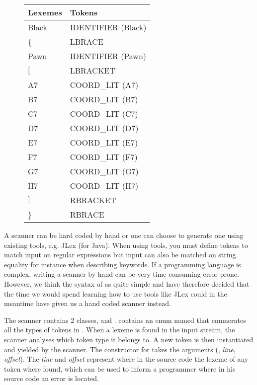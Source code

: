 \begin{figure}
\begin{tabular}{|l|l|}
        \hline
        Lexemes & Tokens             \\ \hline
        Black   & IDENTIFIER (Black) \\ 
        \{       & LBRACE             \\ 
        Pawn    & IDENTIFIER (Pawn)  \\ 
        $[$       & LBRACKET           \\ 
        A7      & COORD\_LIT (A7)     \\ 
        B7      & COORD\_LIT (B7)     \\ 
        C7      & COORD\_LIT (C7)     \\ 
        D7      & COORD\_LIT (D7)     \\ 
        E7      & COORD\_LIT (E7)     \\ 
        F7      & COORD\_LIT (F7)     \\ 
        G7      & COORD\_LIT (G7)     \\ 
        H7      & COORD\_LIT (H7)     \\ 
        $]$       & RBRACKET           \\ 
        \}       & RBRACE             \\
        \hline
\end{tabular}
\label{table:lexemestotokens}
\end{figure}

A scanner can be hard coded by hand or one can choose to generate one using existing tools, e.g. JLex (for Java). When using tools, you must define tokens to match input on regular expressions but input can also be matched on string equality for instance when describing keywords. If a programming language is complex, writing a scanner by hand can be very time consuming error prone. However, we think the syntax of \productname{} as quite simple and have therefore decided that the time we would spend learning how to use tools like JLex could in the meantime have given us a hand coded scanner instead.

The scanner contains 2 classes,  and .  contains an enum named  that enumerates all the types of tokens in \productname{}. When a lexeme is found in the input stream, the scanner analyses which token type it belongs to. A new token is then instantiated and yielded by the scanner. The constructor for  takes the arguments (, \textit{line}, \textit{offset}). The \textit{line} and \textit{offset} represent where in the source code the lexeme of any token where found, which can be used to inform a programmer where in his source code an error is located.
 
